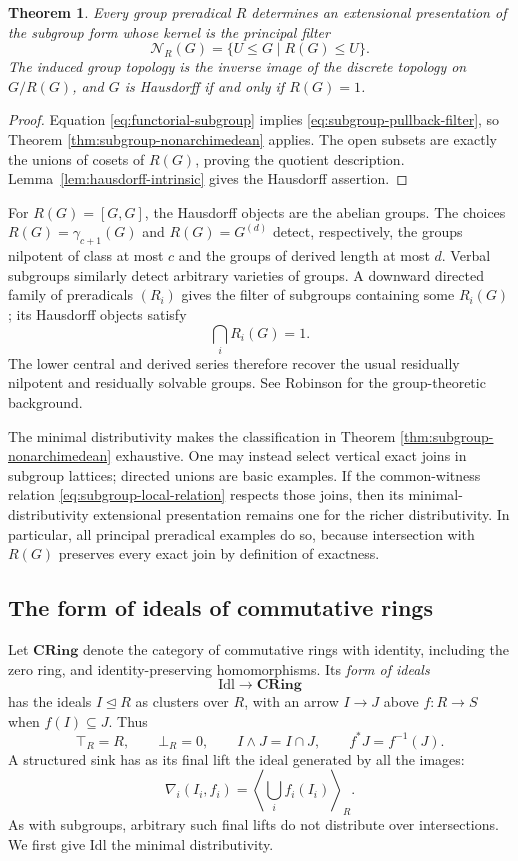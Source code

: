 \documentclass[12pt,oneside,reqno]{amsart}
\newtheorem{theorem}{Theorem}[section]
\theoremstyle{definition}
\theoremstyle{remark}
\newcommand{\Idl}{\mathrm{Idl}}
\newcommand{\CRing}{\mathbf{CRing}}
\begin{document}
\begin{theorem}\label{thm:preradical-topology}
Every group preradical \(R\) determines an extensional presentation of
the subgroup form whose kernel is the principal filter
\[
             \mathcal N_R(G)=
             \{U\leqslant G\mid R(G)\leqslant U\}.
\]
The induced group topology is the inverse image of the discrete
topology on \(G/R(G)\), and \(G\) is Hausdorff if and only if
\(R(G)=1\).
\end{theorem}

\begin{proof}
Equation \eqref{eq:functorial-subgroup} implies
\eqref{eq:subgroup-pullback-filter}, so Theorem
\ref{thm:subgroup-nonarchimedean} applies.  The open subsets are exactly
the unions of cosets of \(R(G)\), proving the quotient description.
Lemma~\ref{lem:hausdorff-intrinsic} gives the Hausdorff assertion.
\end{proof}

For \(R(G)=[G,G]\), the Hausdorff objects are the abelian groups.  The
choices \(R(G)=\gamma_{c+1}(G)\) and \(R(G)=G^{(d)}\) detect,
respectively, the groups nilpotent of class at most \(c\) and the groups
of derived length at most \(d\).  Verbal subgroups similarly detect
arbitrary varieties of groups.  A downward directed family of
preradicals \((R_i)\) gives the filter of subgroups containing some
\(R_i(G)\); its Hausdorff objects satisfy
\[
                           \bigcap_iR_i(G)=1.
\]
The lower central and derived series therefore recover the usual
residually nilpotent and residually solvable groups.  See Robinson
\cite{Robinson} for the group-theoretic background.

The minimal distributivity makes the classification in Theorem
\ref{thm:subgroup-nonarchimedean} exhaustive.  One may instead select
vertical exact joins in subgroup lattices; directed unions are basic
examples.  If the common-witness relation
\eqref{eq:subgroup-local-relation} respects those joins, then its
minimal-distributivity extensional presentation remains one for the
richer distributivity.  In particular, all principal preradical
examples do so, because intersection with \(R(G)\) preserves every
exact join by definition of exactness.

\subsection{The form of ideals of commutative rings}

Let \(\CRing\) denote the category of commutative rings with identity,
including the zero ring, and identity-preserving homomorphisms.  Its
\emph{form of ideals}
\[
                         \Idl\longrightarrow\CRing
\]
has the ideals \(I\trianglelefteq R\) as clusters over \(R\), with an
arrow \(I\to J\) above \(f:R\to S\) when \(f(I)\subseteq J\).
Thus
\[
 \top_R=R,\qquad \bot_R=0,\qquad I\wedge J=I\cap J,\qquad
 f^*J=f^{-1}(J).
\]
A structured sink has as its final lift the ideal generated by all the
images:
\[
       \nabla_i(I_i,f_i)=
       \left\langle\bigcup_i f_i(I_i)\right\rangle_R.
\]
As with subgroups, arbitrary such final lifts do not distribute over
intersections.  We first give \(\Idl\) the minimal distributivity.
\end{document}
